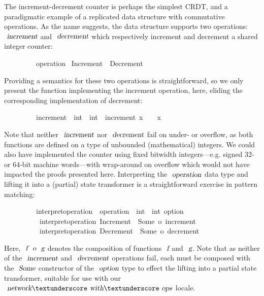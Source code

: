 The increment-decrement counter is perhaps the simplest CRDT, and a paradigmatic example of a replicated data structure with commutative operations.
As the name suggests, the data structure supports two operations: $\isa{increment}$ and $\isa{decrement}$ which respectively increment and decrement a shared integer counter:
\vspace{0.35em}
\begin{isabellebody}
\ \ \ \ \ \ \ \ \ operation {\isacharequal}\ Increment\ {\isacharbar}\ Decrement
\end{isabellebody}
\vspace{0.35em}
Providing a semantics for these two operations is straightforward, so we only present the function implementing the increment operation, here, eliding the corresponding implementation of decrement:
\vspace{0.35em}
\begin{isabellebody}
\ \ \ \ \ \ \ \ \ increment\ {\isacharcolon}{\isacharcolon}\ {\isachardoublequoteopen}int\ {\isasymRightarrow}\ int{\isachardoublequoteclose}\ \ {\isachardoublequoteopen}increment\ x\ {\isasymequiv}\ {}\ {\isacharplus}\ x{\isachardoublequoteclose}
\end{isabellebody}
\vspace{0.35em}
Note that neither $\isa{increment}$ nor $\isa{decrement}$ fail on under- or overflow, as both functions are defined on a type of unbounded (mathematical) integers.
We could also have implemented the counter using fixed bitwidth integers---e.g. signed 32- or 64-bit machine words---with wrap-around on overflow which would not have impacted the proofs presented here.
Interpreting the $\isa{operation}$ data type and lifting it into a (partial) state transformer is a straightforward exercise in pattern matching:
\vspace{0.35em}
\begin{isabellebody}
\ \ \ \ \ \ \ \ \ interpret{\isacharunderscore}operation\ {\isacharcolon}{\isacharcolon}\ {\isachardoublequoteopen}operation\ {\isasymRightarrow}\ int\ {\isasymRightarrow}\ int\ option{\isachardoublequoteclose}\ \isanewline
\ \ \ \ \ \ \ \ \ \ {\isachardoublequoteopen}interpret{\isacharunderscore}operation\ Increment\ {\isacharequal}\ Some\ o\ increment{\isachardoublequoteclose}\ {\isacharbar}\isanewline
\ \ \ \ \ \ \ \ \ \ {\isachardoublequoteopen}interpret{\isacharunderscore}operation\ Decrement\ {\isacharequal}\ Some\ o\ decrement{\isachardoublequoteclose}
\end{isabellebody}
\vspace{0.35em}
Here, $\isa{f}\ \isa{o}\ \isa{g}$ denotes the composition of functions $\isa{f}$ and $\isa{g}$.
Note that as neither of the $\isa{increment}$ and $\isa{decrement}$ operations fail, each must be composed with the $\isa{Some}$ constructor of the $\isa{option}$ type to effect the lifting into a partial state transformer, suitable for use with our $\isa{network}{\isacharunderscore}\isa{with}{\isacharunderscore}\isa{ops}$ locale.


